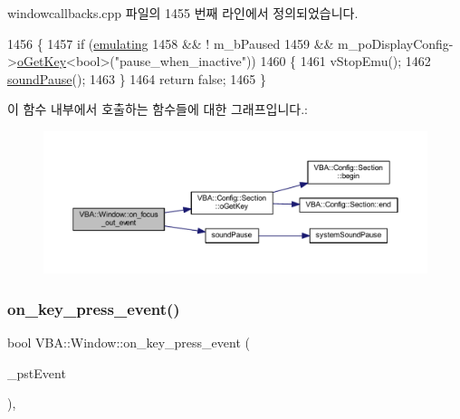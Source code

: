 windowcallbacks.\+cpp 파일의 1455 번째 라인에서 정의되었습니다.


\begin{DoxyCode}
1456 \{
1457   \textcolor{keywordflow}{if} (\mbox{\hyperlink{gb_globals_8h_af9cc36078b1b311753963297ae7f2a74}{emulating}}
1458       && ! m\_bPaused
1459       && m\_poDisplayConfig->\mbox{\hyperlink{class_v_b_a_1_1_config_1_1_section_ab169d7aae4e9dde91418ba1668e3ad39}{oGetKey}}<\textcolor{keywordtype}{bool}>(\textcolor{stringliteral}{"pause\_when\_inactive"}))
1460   \{
1461     vStopEmu();
1462     \mbox{\hyperlink{_sound_8cpp_a0716e7957671de324eeaa4ac1729d6b7}{soundPause}}();
1463   \}
1464   \textcolor{keywordflow}{return} \textcolor{keyword}{false};
1465 \}
\end{DoxyCode}
이 함수 내부에서 호출하는 함수들에 대한 그래프입니다.\+:
\nopagebreak
\begin{figure}[H]
\begin{center}
\leavevmode
\includegraphics[width=350pt]{class_v_b_a_1_1_window_a1153e9927db5e913c4364d507adbfc4b_cgraph}
\end{center}
\end{figure}
\mbox{\label{class_v_b_a_1_1_window_a3fc2f454d5b9bbb8a74d44c3ac10655d}} 
\subsubsection{\texorpdfstring{on\+\_\+key\+\_\+press\+\_\+event()}{on\_key\_press\_event()}}
{\footnotesize\ttfamily bool V\+B\+A\+::\+Window\+::on\+\_\+key\+\_\+press\+\_\+event (\begin{DoxyParamCaption}\item[{Gdk\+Event\+Key $\ast$}]{\+\_\+pst\+Event }\end{DoxyParamCaption})\hspace{0.3cm}{\ttfamily [protected]}, {\ttfamily [virtual]}}



